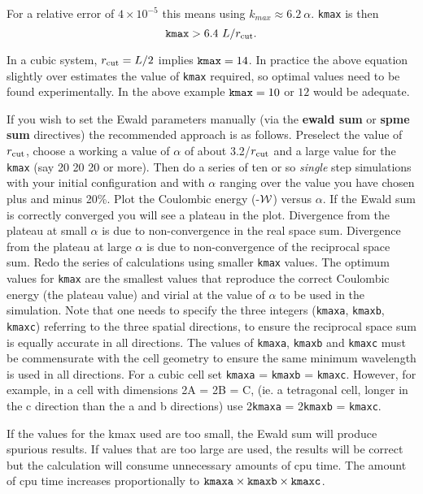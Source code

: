 For a relative error of $4 \times 10^{-5}$ this means using
$k_{max} \approx 6.2~\alpha$.  {\tt kmax} is then
\begin{equation}
{\tt kmax} > 6.4~L/r_{\rm cut}.
\end {equation}

In a cubic system, $r_{\rm cut}=L/2$ implies ${\tt kmax}=14$.
In practice the above equation slightly over estimates the value
of {\tt kmax} required, so optimal values need to be found
experimentally.  In the above example ${\tt kmax}=10$ or $12$
would be adequate.

If you wish to set the Ewald parameters manually (via the
{\bf ewald sum} or {\bf spme sum} directives) the recommended
approach is as follows.  Preselect the value of $r_{\rm cut}$,
choose a working a value of $\alpha$ of about 3.2/$r_{\rm cut}$
and a large value for the {\tt kmax} (say 20 20 20 or more).
Then do a series of ten or so {\em single} step simulations with
your initial configuration and with $\alpha$ ranging over the
value you have chosen plus and minus 20\%.  Plot the Coulombic
energy (-$\cal W$) versus $\alpha$.  If the Ewald sum is correctly
converged you will see a plateau in the plot.  Divergence from the
plateau at small $\alpha$ is due to non-convergence in the real
space sum.  Divergence from the plateau at large $\alpha$ is due to
non-convergence of the reciprocal space sum.  Redo the series of
calculations using smaller {\tt kmax} values.  The optimum values
for {\tt kmax} are the smallest values that reproduce the correct
Coulombic energy (the plateau value) and virial at the value of
$\alpha$ to be used in the simulation.  Note that one needs to
specify the three integers ({\tt kmaxa}, {\tt kmaxb}, {\tt kmaxc})
referring to the three spatial directions, to ensure the reciprocal
space sum is equally accurate in all directions.  The values of
{\tt kmaxa}, {\tt kmaxb} and {\tt kmaxc} must be commensurate with
the cell geometry to ensure the same minimum wavelength is used in
all directions.  For a cubic cell set {\tt kmaxa} = {\tt kmaxb} = {\tt kmaxc}.
However, for example, in a cell with dimensions 2A = 2B = C,
(ie. a tetragonal cell, longer in the c direction than the a and b directions)
use 2{\tt kmaxa} = 2{\tt kmaxb} = {\tt kmaxc}.

If the values for the kmax used are too small, the Ewald sum will
produce spurious results.  If values that are too large are used,
the results will be correct but the calculation will consume unnecessary
amounts of cpu time. The amount of cpu time increases proportionally
to ${\tt kmaxa}  \times {\tt kmaxb} \times {\tt kmaxc}$.

